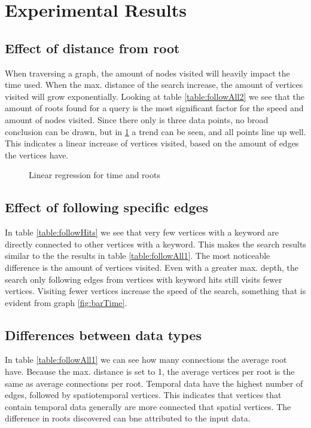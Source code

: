 \section{Experimental Results}
\label{sec:experimentalResults}

\subsection{Effect of distance from root}
When traversing a graph, the amount of nodes visited will heavily impact the time used. When the max. distance of the search increase, the amount of vertices visited will grow exponentially. Looking at table \ref{table:followAll2} we see that the amount of roots found for a query is the most significant factor for the speed and amount of nodes visited. Since there only is three data points, no broad conclusion can be drawn, but in \ref{fig:linReg1and2} a trend can be seen, and all points line up well. This indicates a linear increase of vertices visited, based on the amount of edges the vertices have. 


%


\begin{figure}
	\caption{Linear regression for time and roots}
	\label{fig:linReg1and2}
	
\end{figure}

\subsection{Effect of following specific edges}
In table \ref{table:followHits} we see that very few vertices with a keyword are directly connected to other vertices with a keyword. This makes the search results similar to the the results in table \ref{table:followAll1}. The most noticeable difference is the amount of vertices visited. Even with a greater max. depth, the search only following edges from vertices with keyword hits still visits fewer vertices. Visiting fewer vertices increase the speed of the search, something that is evident from graph \ref{fig:barTime}.



\subsection{Differences between data types}
In table \ref{table:followAll1} we can see how many connections the average root have. Because the max. distance is set to 1, the average vertices per root is the same as average connections per root. Temporal data have the highest number of edges, followed by spatiotemporal vertices. This indicates that vertices that contain temporal data generally are more connected that spatial vertices. The difference in roots discovered can bne attributed to the input data.

